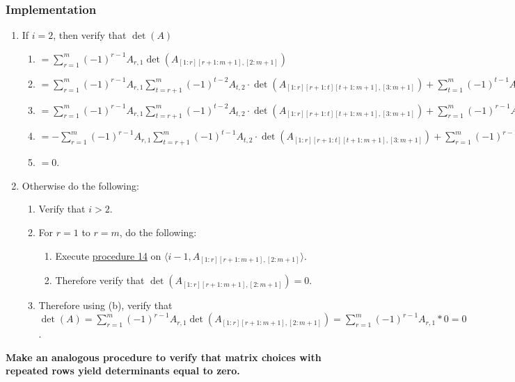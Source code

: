 \documentclass[twocolumn]{article}
\begin{document}
			\subsubsection{Implementation}
				\begin{enumerate}
					\item If $i=2$, then verify that $\det(A)$
					\begin{enumerate}
						\item $=\sum_{r=1}^m (-1)^{r-1}A_{r,1}\det(A_{[1:r][r+1:m+1],[2:m+1]})$
						\item $=\sum_{r=1}^m (-1)^{r-1}A_{r,1}\sum_{t=r+1}^m (-1)^{t-2}A_{t,2}\cdot\det(A_{[1:r][r+1:t][t+1:m+1],[3:m+1]})+\sum_{t=1}^m (-1)^{t-1}A_{t,1}\sum_{r=1}^{t-1} (-1)^{r-1}A_{r,2}\cdot\det(A_{[1:r][r+1:t][t+1:m+1],[3:m+1]})$
						\item $=\sum_{r=1}^m (-1)^{r-1}A_{r,1}\sum_{t=r+1}^m (-1)^{t-2}A_{t,2}\cdot\det(A_{[1:r][r+1:t][t+1:m+1],[3:m+1]})+\sum_{r=1}^m (-1)^{r-1}A_{r,2}\sum_{t=r+1}^m (-1)^{t-1}A_{t,1}\cdot\det(A_{[1:r][r+1:t][t+1:m+1],[3:m+1]})$
						\item $=-\sum_{r=1}^m (-1)^{r-1}A_{r,1}\sum_{t=r+1}^m (-1)^{t-1}A_{t,2}\cdot\det(A_{[1:r][r+1:t][t+1:m+1],[3:m+1]})+\sum_{r=1}^m (-1)^{r-1}A_{r,1}\sum_{t=r+1}^m (-1)^{t-1}A_{t,2}\cdot\det(A_{[1:r][r+1:t][t+1:m+1],[3:m+1]})$
						\item $=0$.
					\end{enumerate}
					\item Otherwise do the following:
					\begin{enumerate}
						\item Verify that $i>2$.
						\item For $r=1$ to $r=m$, do the following:
						\begin{enumerate}
							\item Execute \hyperref[sec:procedure 14]{procedure 14} on $\langle i-1,\allowbreak A_{[1:r][r+1:m+1],[2:m+1]}\rangle$.
							\item Therefore verify that $\det(A_{[1:r][r+1:m+1],[2:m+1]})=0$.
						\end{enumerate}
						\item Therefore using (b), verify that $\det(A)=\sum_{r=1}^m (-1)^{r-1}A_{r,1}\det(A_{[1:r][r+1:m+1],[2:m+1]})=\sum_{r=1}^m (-1)^{r-1}A_{r,1}*0=0$.
					\end{enumerate}
				\end{enumerate}
			\textbf{Make an analogous procedure to verify that matrix choices with repeated rows yield determinants equal to zero.}
\end{document}
